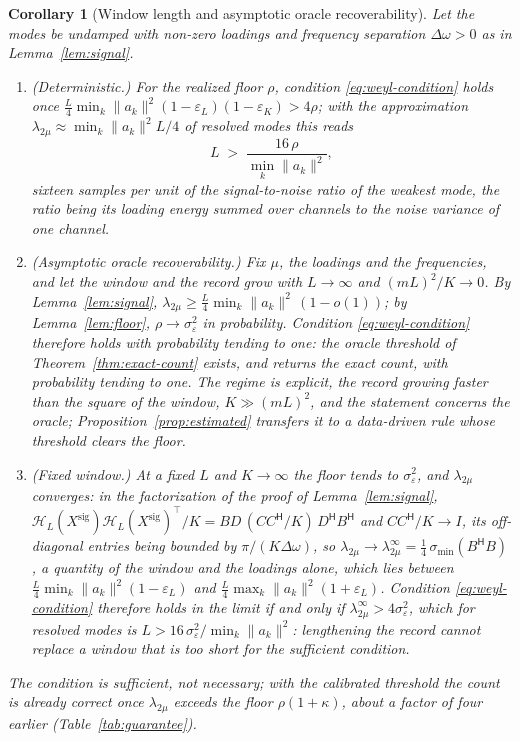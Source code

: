 \documentclass{article}
\newtheorem{corollary}{\bf Corollary}
\begin{document}
\begin{corollary}[Window length and asymptotic oracle recoverability] \label{cor:window}
Let the modes be undamped with non-zero loadings and frequency separation $\Delta\omega > 0$ as in Lemma~\ref{lem:signal}.
\begin{enumerate}
\renewcommand{\labelenumi}{(\roman{enumi})}
\item (Deterministic.) For the realized floor $\rho$, condition \eqref{eq:weyl-condition} holds once $\frac{L}{4}\min_k \lVert a_k \rVert^{2}(1 - \varepsilon_L)(1 - \varepsilon_K) > 4\rho$; with the approximation $\lambda_{2\mu} \approx \min_k \lVert a_k \rVert^{2} L/4$ of resolved modes this reads
\begin{equation} \label{eq:window}
L \;>\; \frac{16\,\rho}{\min_k \lVert a_k \rVert^{2}} ,
\end{equation}
sixteen samples per unit of the signal-to-noise ratio of the weakest mode, the ratio being its loading energy summed over channels to the noise variance of one channel.
\item (Asymptotic oracle recoverability.) Fix $\mu$, the loadings and the frequencies, and let the window and the record grow with $L \to \infty$ and $(mL)^{2}/K \to 0$. By Lemma~\ref{lem:signal}, $\lambda_{2\mu} \ge \frac{L}{4}\min_k \lVert a_k \rVert^{2}\,(1 - o(1))$; by Lemma~\ref{lem:floor}, $\rho \to \sigma_\varepsilon^{2}$ in probability. Condition \eqref{eq:weyl-condition} therefore holds with probability tending to one: the oracle threshold of Theorem~\ref{thm:exact-count} exists, and returns the exact count, with probability tending to one. The regime is explicit, the record growing faster than the square of the window, $K \gg (mL)^{2}$, and the statement concerns the oracle; Proposition~\ref{prop:estimated} transfers it to a data-driven rule whose threshold clears the floor.
\item (Fixed window.) At a fixed $L$ and $K \to \infty$ the floor tends to $\sigma_\varepsilon^{2}$, and $\lambda_{2\mu}$ converges: in the factorization of the proof of Lemma~\ref{lem:signal}, $\mathcal{H}_L(X^{\mathrm{sig}})\mathcal{H}_L(X^{\mathrm{sig}})^{\top}/K = B D\,(C C^{\mathsf{H}}/K)\,D^{\mathsf{H}} B^{\mathsf{H}}$ and $C C^{\mathsf{H}}/K \to I$, its off-diagonal entries being bounded by $\pi/(K\Delta\omega)$, so $\lambda_{2\mu} \to \lambda_{2\mu}^{\infty} = \tfrac{1}{4}\,\sigma_{\min}(B^{\mathsf{H}} B)$, a quantity of the window and the loadings alone, which lies between $\frac{L}{4}\min_k \lVert a_k \rVert^{2}(1 - \varepsilon_L)$ and $\frac{L}{4}\max_k \lVert a_k \rVert^{2}(1 + \varepsilon_L)$. Condition \eqref{eq:weyl-condition} therefore holds in the limit if and only if $\lambda_{2\mu}^{\infty} > 4\sigma_\varepsilon^{2}$, which for resolved modes is $L > 16\,\sigma_\varepsilon^{2} / \min_k \lVert a_k \rVert^{2}$: lengthening the record cannot replace a window that is too short for the sufficient condition.
\end{enumerate}
The condition is sufficient, not necessary; with the calibrated threshold the count is already correct once $\lambda_{2\mu}$ exceeds the floor $\rho(1 + \kappa)$, about a factor of four earlier (Table~\ref{tab:guarantee}).
\end{corollary}
\end{document}
